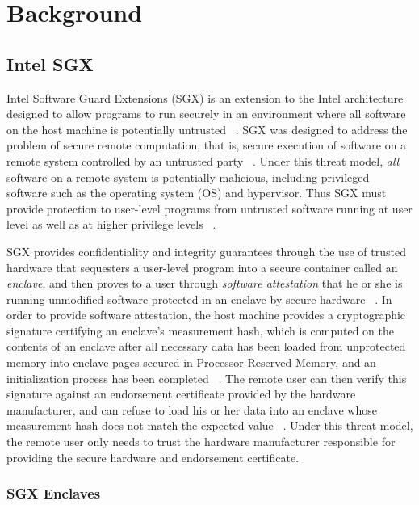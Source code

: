 \section{Background}

\subsection{Intel SGX}

Intel Software Guard Extensions (SGX) is an extension to the Intel architecture designed to allow programs to run securely in an environment where all software on the host machine is potentially untrusted ~\cite{intel_corporation_intel_2016}. SGX was designed to address the problem of secure remote computation, that is, secure execution of software on a remote system controlled by an untrusted party ~\cite{intel_corporation_intel_2016}. Under this threat model, \emph{all} software on a remote system is potentially malicious, including privileged software such as the operating system (OS) and hypervisor. Thus SGX must provide protection to user-level programs from untrusted software running at user level as well as at higher privilege levels ~\cite{costan_intel_2016}. 

SGX provides confidentiality and integrity guarantees through the use of trusted hardware that sequesters a user-level program into a secure container called an \emph{enclave}, and then proves to a user through \emph{software attestation} that he or she is running unmodified software protected in an enclave by secure hardware ~\cite{intel_corporation_intel_2016}. In order to provide software attestation, the host machine provides a cryptographic signature certifying an enclave's measurement hash, which is computed on the contents of an enclave after all necessary data has been loaded from unprotected memory into enclave pages secured in Processor Reserved Memory, and an initialization process has been completed ~\cite{costan_intel_2016}. The remote user can then verify this signature against an endorsement certificate provided by the hardware manufacturer, and can refuse to load his or her data into an enclave whose measurement hash does not match the expected value ~\cite{intel_corporation_intel_2016, costan_intel_2016}. Under this threat model, the remote user only needs to trust the hardware manufacturer responsible for providing the secure hardware and endorsement certificate.

\subsubsection{SGX Enclaves}

